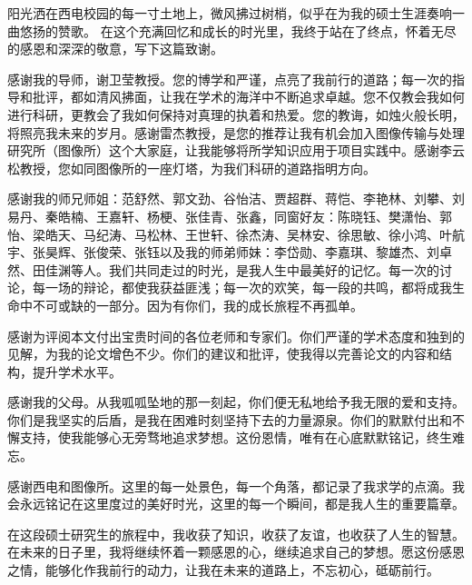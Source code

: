 
阳光洒在西电校园的每一寸土地上，微风拂过树梢，似乎在为我的硕士生涯奏响一曲悠扬的赞歌。
在这个充满回忆和成长的时光里，我终于站在了终点，怀着无尽的感恩和深深的敬意，写下这篇致谢。

感谢我的导师，谢卫莹教授。您的博学和严谨，点亮了我前行的道路；每一次的指导和批评，都如清风拂面，让我在学术的海洋中不断追求卓越。您不仅教会我如何进行科研，更教会了我如何保持对真理的执着和热爱。您的教诲，如烛火般长明，将照亮我未来的岁月。感谢雷杰教授，是您的推荐让我有机会加入图像传输与处理研究所（图像所）这个大家庭，让我能够将所学知识应用于项目实践中。感谢李云松教授，您如同图像所的一座灯塔，为我们科研的道路指明方向。

感谢我的师兄师姐：范舒然、郭文劲、谷怡洁、贾超群、蒋恺、李艳林、刘攀、刘易丹、秦皓楠、王嘉轩、杨梗、张佳青、张鑫，同窗好友：陈晓钰、樊潇怡、郭怡、梁皓天、马纪涛、马松林、王世轩、徐杰涛、吴林安、徐思敏、徐小鸿、叶航宇、张昊辉、张俊荣、张钰以及我的师弟师妹：李岱勋、李嘉琪、黎雄杰、刘卓然、田佳渊等人。我们共同走过的时光，是我人生中最美好的记忆。每一次的讨论，每一场的辩论，都使我获益匪浅；每一次的欢笑，每一段的共鸣，都将成我生命中不可或缺的一部分。因为有你们，我的成长旅程不再孤单。

感谢为评阅本文付出宝贵时间的各位老师和专家们。你们严谨的学术态度和独到的见解，为我的论文增色不少。你们的建议和批评，使我得以完善论文的内容和结构，提升学术水平。

感谢我的父母。从我呱呱坠地的那一刻起，你们便无私地给予我无限的爱和支持。你们是我坚实的后盾，是我在困难时刻坚持下去的力量源泉。你们的默默付出和不懈支持，使我能够心无旁骛地追求梦想。这份恩情，唯有在心底默默铭记，终生难忘。

感谢西电和图像所。这里的每一处景色，每一个角落，都记录了我求学的点滴。我会永远铭记在这里度过的美好时光，这里的每一个瞬间，都是我人生的重要篇章。

在这段硕士研究生的旅程中，我收获了知识，收获了友谊，也收获了人生的智慧。在未来的日子里，我将继续怀着一颗感恩的心，继续追求自己的梦想。愿这份感恩之情，能够化作我前行的动力，让我在未来的道路上，不忘初心，砥砺前行。
